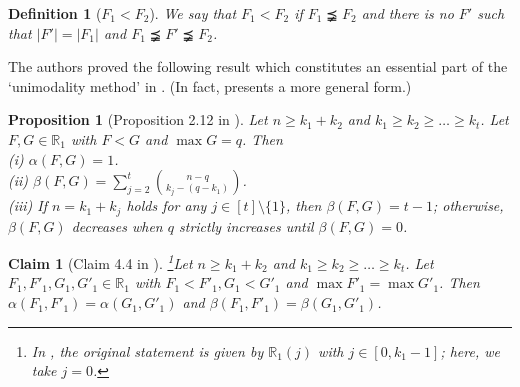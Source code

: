 \documentclass[a4paper,11pt]{article}
\newtheorem{definition}[theorem]{Definition}
\newtheorem{proposition}[theorem]{Proposition}
\newtheorem{remark}[theorem]{Remark}
\newtheorem{claim}[theorem]{Claim}
\begin{document}
\begin{definition}[$F_1<F_2$]\label{<}
 We say that $F_1<F_2$
 if $F_1\precneqq F_2$ and there is no $F'$ such that $|F'|=|F_1|$  and $F_1\precneqq F' \precneqq F_2$. %



\end{definition}



 The authors   proved the  following  result which constitutes an essential part of the `unimodality method' in  \cite{HP+}. (In fact,  \cite{HP+} presents a more general form.)


\begin{proposition}[Proposition 2.12 in \cite{HP+}]\label{clm23}
Let $n\geq k_1+k_2$ and $k_1\geq k_2\geq \dots\geq k_t$.
Let $F, G \in \mathbb{R}_1$ with $F<G$ and $\max G=q$. Then \\
(i) $\alpha(F, G)=1$.\\
(ii) $\beta(F, G)=\sum_{j=2}^t{n-q\choose k_j-(q-k_1)}$.\\
 (iii) If $n= k_1+k_j$ holds for any $j\in [t]\setminus \{1\}$, then $\beta(F, G)=t-1$; otherwise, $\beta(F, G)$ decreases when $q$ strictly increases until $\beta(F, G)=0$.
\end{proposition}

\begin{claim}[Claim 4.4 in \cite{HP+}]\footnote{In \cite{HP+}, the original statement is given by $\mathbb{R}_1(j)$ with $j\in [0, k_1-1]$; here, we take $j=0$. }\label{0000-}
Let $n\geq k_1+k_2$ and $k_1\geq k_2\geq \dots \geq k_t$.
Let $F_1, F'_1, G_1, G'_1 \in \mathbb{R}_1$ with $F_1<F'_1, G_1<G'_1$ and  $\max F'_1=\max G'_1$. Then $\alpha(F_1, F'_1)=\alpha(G_1, G'_1)$ and $\beta(F_1, F'_1)=\beta(G_1, G'_1)$.
\end{claim}
\end{document}
